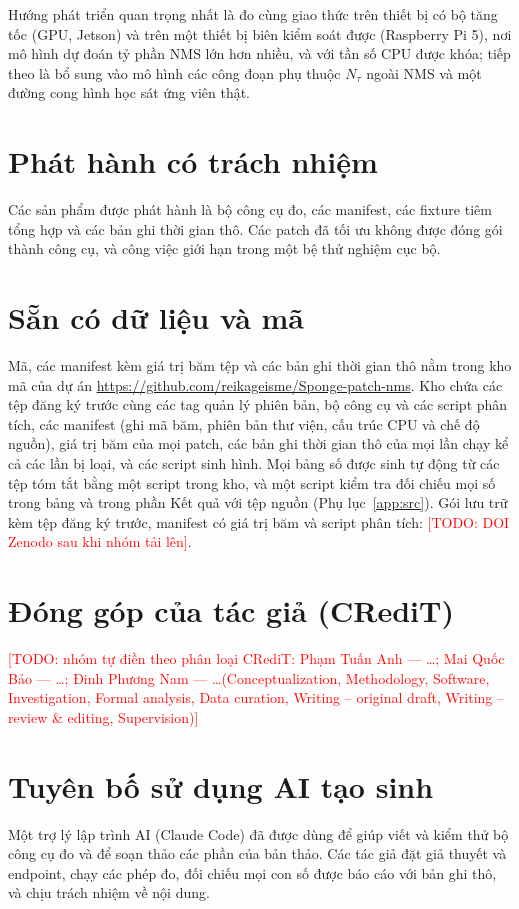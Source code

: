 \documentclass[12pt,a4paper]{article}
\newcommand{\todo}[1]{\textcolor{red}{[TODO: #1]}}
\newcommand{\Ntau}{N_{\tau}}
\begin{document}
Hướng phát triển quan trọng nhất là đo cùng giao thức trên thiết bị có bộ tăng tốc (GPU, Jetson) và trên một thiết bị biên kiểm soát được (Raspberry Pi 5), nơi mô hình dự đoán tỷ phần NMS lớn hơn nhiều, và với tần số CPU được khóa; tiếp theo là bổ sung vào mô hình các công đoạn phụ thuộc $\Ntau$ ngoài NMS và một đường cong hình học sát ứng viên thật.

\section*{Phát hành có trách nhiệm}
Các sản phẩm được phát hành là bộ công cụ đo, các manifest, các fixture tiêm tổng hợp và các bản ghi thời gian thô. Các patch đã tối ưu không được đóng gói thành công cụ, và công việc giới hạn trong một bệ thử nghiệm cục bộ.

\section*{Sẵn có dữ liệu và mã}
Mã, các manifest kèm giá trị băm tệp và các bản ghi thời gian thô nằm trong kho mã của dự án \url{https://github.com/reikageisme/Sponge-patch-nms}. Kho chứa các tệp đăng ký trước cùng các tag quản lý phiên bản, bộ công cụ và các script phân tích, các manifest (ghi mã băm, phiên bản thư viện, cấu trúc CPU và chế độ nguồn), giá trị băm của mọi patch, các bản ghi thời gian thô của mọi lần chạy kể cả các lần bị loại, và các script sinh hình. Mọi bảng số được sinh tự động từ các tệp tóm tắt bằng một script trong kho, và một script kiểm tra đối chiếu mọi số trong bảng và trong phần Kết quả với tệp nguồn (Phụ lục~\ref{app:src}). Gói lưu trữ kèm tệp đăng ký trước, manifest có giá trị băm và script phân tích: \todo{DOI Zenodo sau khi nhóm tải lên}.

\section*{Đóng góp của tác giả (CRediT)}
\todo{nhóm tự điền theo phân loại CRediT: Phạm Tuấn Anh --- \ldots; Mai Quốc Bảo --- \ldots; Đinh Phương Nam --- \ldots (Conceptualization, Methodology, Software, Investigation, Formal analysis, Data curation, Writing -- original draft, Writing -- review \& editing, Supervision)}

\section*{Tuyên bố sử dụng AI tạo sinh}
Một trợ lý lập trình AI (Claude Code) đã được dùng để giúp viết và kiểm thử bộ công cụ đo và để soạn thảo các phần của bản thảo. Các tác giả đặt giả thuyết và endpoint, chạy các phép đo, đối chiếu mọi con số được báo cáo với bản ghi thô, và chịu trách nhiệm về nội dung.
\end{document}
